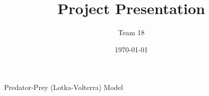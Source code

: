 \documentclass[xcolor=dvipsnames]{beamer}
\title{Project Presentation}
\author{Team 18 }
\institute{SGTB Khalsa College, DU}
\date{\today}
\begin{document}
\begin{frame}
  \titlepage Predator-Prey (Lotka-Volterra) Model
\vspace*{-10pt}
\end{frame}











% 
% 


\end{document}
